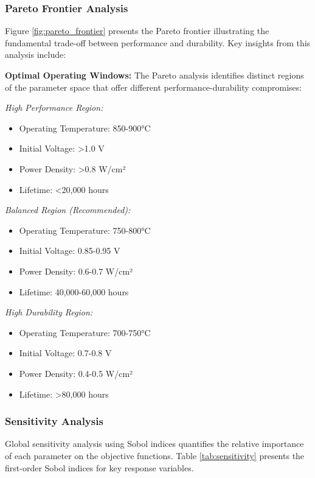 \documentclass[conference]{IEEEtran}
\begin{document}
\subsubsection{Pareto Frontier Analysis}

Figure \ref{fig:pareto_frontier} presents the Pareto frontier illustrating the fundamental trade-off between performance and durability. Key insights from this analysis include:

\textbf{Optimal Operating Windows:}
The Pareto analysis identifies distinct regions of the parameter space that offer different performance-durability compromises:

\textit{High Performance Region:}
\begin{itemize}
\item Operating Temperature: 850-900°C
\item Initial Voltage: >1.0 V
\item Power Density: >0.8 W/cm²
\item Lifetime: <20,000 hours
\end{itemize}

\textit{Balanced Region (Recommended):}
\begin{itemize}
\item Operating Temperature: 750-800°C
\item Initial Voltage: 0.85-0.95 V
\item Power Density: 0.6-0.7 W/cm²
\item Lifetime: 40,000-60,000 hours
\end{itemize}

\textit{High Durability Region:}
\begin{itemize}
\item Operating Temperature: 700-750°C
\item Initial Voltage: 0.7-0.8 V
\item Power Density: 0.4-0.5 W/cm²
\item Lifetime: >80,000 hours
\end{itemize}

\subsubsection{Sensitivity Analysis}

Global sensitivity analysis using Sobol indices quantifies the relative importance of each parameter on the objective functions. Table \ref{tab:sensitivity} presents the first-order Sobol indices for key response variables.
\end{document}
